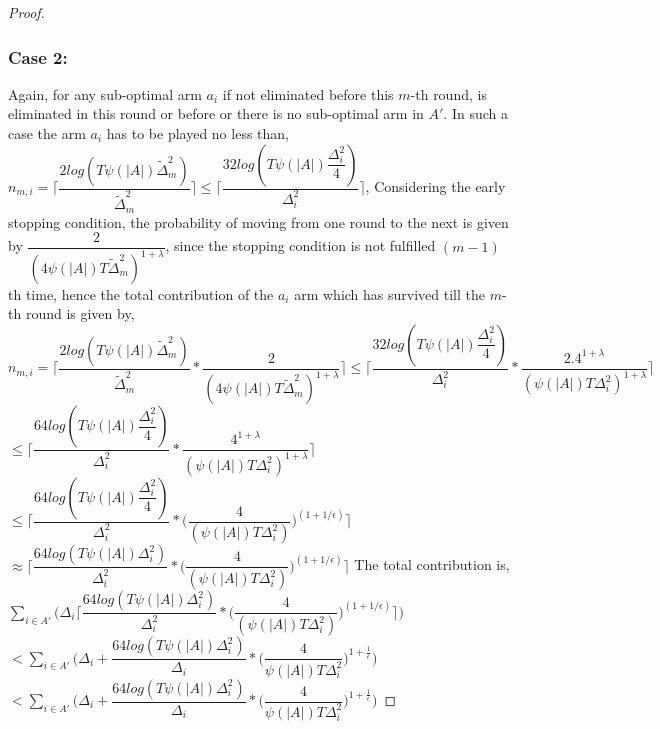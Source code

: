 \begin{proof}
\subsubsection{\textbf{Case 2:}}
Again, for any sub-optimal arm $a_{i}$ if not eliminated before this $m$-th round, is eliminated in this round or before or there is no sub-optimal arm in $A'$. In such a case the arm $a_{i}$ has to be played no less than,
\newline
\hspace*{8em}$n_{m,i}=\bigg\lceil \dfrac{2log({T\psi(|A|)\tilde{\Delta}_{m}^{2}})}{\tilde{\Delta}_{m}^{2}}\bigg\rceil \leq \bigg\lceil \dfrac{32log({T\psi(|A|)\dfrac{\Delta_{i}^{2}}{4}})}{\Delta_{i}^{2}}\bigg\rceil$,
\newline
Considering the early stopping condition, the probability of moving from one round to the next is given by $\dfrac{2}{(4\psi(|A|)T\tilde{\Delta}_{m}^{2})^{1+\lambda}}$, since the stopping condition is not fulfilled $(m-1)$th time, hence the total contribution of the $a_{i}$ arm which has survived till the $m$-th round is given by,
\newline
$n_{m,i}=\bigg\lceil \dfrac{2log({T\psi(|A|)\tilde{\Delta}_{m}^{2}})}{\tilde{\Delta}_{m}^{2}}*\dfrac{2}{(4\psi(|A|)T\tilde{\Delta}_{m}^{2})^{1+\lambda}}\bigg\rceil \leq \bigg\lceil \dfrac{32log({T\psi(|A|)\dfrac{\Delta_{i}^{2}}{4}})}{\Delta_{i}^{2}}*\dfrac{2.4^{1+\lambda}}{(\psi(|A|)T\Delta_{i}^{2})^{1+\lambda}}\bigg\rceil$
\newline
\hspace*{21em}$\leq \bigg\lceil \dfrac{64log({T\psi(|A|)\dfrac{\Delta_{i}^{2}}{4}})}{\Delta_{i}^{2}}*\dfrac{4^{1+\lambda}}{(\psi(|A|)T\Delta_{i}^{2})^{1+\lambda}}\bigg\rceil$
\newline
\hspace*{21em}$\leq \bigg\lceil \dfrac{64log({T\psi(|A|)\dfrac{\Delta_{i}^{2}}{4}})}{\Delta_{i}^{2}}*\bigg(\dfrac{4}{(\psi(|A|)T\Delta_{i}^{2})}\bigg)^{(1+1/\epsilon)}\bigg\rceil$
\newline
\hspace*{21em}$\approx \bigg\lceil \dfrac{64log({T\psi(|A|)\Delta_{i}^{2}})}{\Delta_{i}^{2}}*\bigg(\dfrac{4}{(\psi(|A|)T\Delta_{i}^{2})}\bigg)^{(1+1/\epsilon)}\bigg\rceil$
\newline
The total contribution is,
$\sum_{i\in A'}\bigg(\Delta_{i}\bigg\lceil \dfrac{64log({T\psi(|A|)\Delta_{i}^{2}})}{\Delta_{i}^{2}}*\bigg(\dfrac{4}{(\psi(|A|)T\Delta_{i}^{2})}\bigg)^{(1+1/\epsilon)}\bigg\rceil\bigg)$
\newline
\hspace*{11em}$<\sum_{i\in A'}\bigg(\Delta_{i} + \dfrac{64log({T\psi(|A|)\Delta_{i}^{2}})}{\Delta_{i}}*\bigg(\dfrac{4}{\psi(|A|)T\Delta_{i}^{2}}\bigg)^{1+\frac{1}{\epsilon}}\bigg)$
\newline
\hspace*{11em}$<\sum_{i\in A'}\bigg(\Delta_{i} + \dfrac{64log({T\psi(|A|)\Delta_{i}^{2}})}{\Delta_{i}}*\bigg(\dfrac{4}{\psi(|A|)T\Delta_{i}^{2}}\bigg)^{1+\frac{1}{\epsilon}}\bigg)$
\newline

\end{proof}
